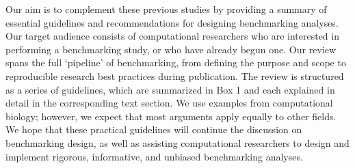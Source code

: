 \documentclass[12pt, a4paper]{article}
\begin{document}
Our aim is to complement these previous studies by providing a summary of essential guidelines and recommendations for designing benchmarking analyses. Our target audience consists of computational researchers who are interested in performing a benchmarking study, or who have already begun one. Our review spans the full `pipeline' of benchmarking, from defining the purpose and scope to reproducible research best practices during publication. The review is structured as a series of guidelines, which are summarized in Box 1 and each explained in detail in the corresponding text section. We use examples from computational biology; however, we expect that most arguments apply equally to other fields. We hope that these practical guidelines will continue the discussion on benchmarking design, as well as assisting computational researchers to design and implement rigorous, informative, and unbiased benchmarking analyses.





\vskip 1cm
\end{document}

